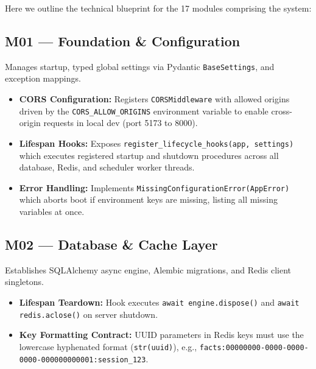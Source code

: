 \documentclass[11pt,a4paper]{article}
\begin{document}
Here we outline the technical blueprint for the 17 modules comprising the system:

\subsection{M01 — Foundation \& Configuration}
Manages startup, typed global settings via Pydantic \texttt{BaseSettings}, and exception mappings.
\begin{itemize}
    \item \textbf{CORS Configuration:} Registers \texttt{CORSMiddleware} with allowed origins driven by the \texttt{CORS_ALLOW_ORIGINS} environment variable to enable cross-origin requests in local dev (port 5173 to 8000).
    \item \textbf{Lifespan Hooks:} Exposes \texttt{register_lifecycle_hooks(app, settings)} which executes registered startup and shutdown procedures across all database, Redis, and scheduler worker threads.
    \item \textbf{Error Handling:} Implements \texttt{MissingConfigurationError(AppError)} which aborts boot if environment keys are missing, listing all missing variables at once.
\end{itemize}

\subsection{M02 — Database \& Cache Layer}
Establishes SQLAlchemy async engine, Alembic migrations, and Redis client singletons.
\begin{itemize}
    \item \textbf{Lifespan Teardown:} Hook executes \texttt{await engine.dispose()} and \texttt{await redis.aclose()} on server shutdown.
    \item \textbf{Key Formatting Contract:} UUID parameters in Redis keys must use the lowercase hyphenated format (\texttt{str(uuid)}), e.g., \texttt{facts:00000000-0000-0000-0000-000000000001:session_123}.
\end{itemize}
\end{document}
